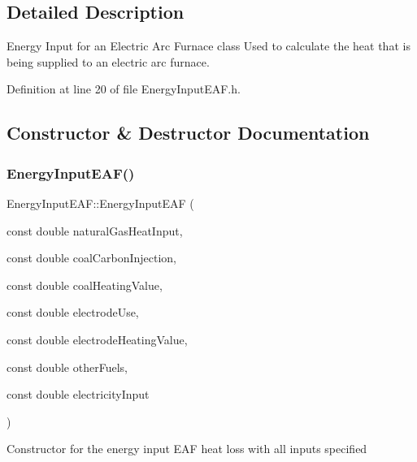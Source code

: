 \subsection{Detailed Description}
Energy Input for an Electric Arc Furnace class Used to calculate the heat that is being supplied to an electric arc furnace. 

Definition at line 20 of file Energy\+Input\+E\+A\+F.\+h.



\subsection{Constructor \& Destructor Documentation}
\mbox{\label{class_energy_input_e_a_f_a385f7047f5019124d7559cdbcb229a04}} 
\subsubsection{\texorpdfstring{Energy\+Input\+E\+A\+F()}{EnergyInputEAF()}\hspace{0.1cm}{\footnotesize\ttfamily [1/3]}}
{\footnotesize\ttfamily Energy\+Input\+E\+A\+F\+::\+Energy\+Input\+E\+AF (\begin{DoxyParamCaption}\item[{const double}]{natural\+Gas\+Heat\+Input,  }\item[{const double}]{coal\+Carbon\+Injection,  }\item[{const double}]{coal\+Heating\+Value,  }\item[{const double}]{electrode\+Use,  }\item[{const double}]{electrode\+Heating\+Value,  }\item[{const double}]{other\+Fuels,  }\item[{const double}]{electricity\+Input }\end{DoxyParamCaption})\hspace{0.3cm}{\ttfamily [inline]}}

Constructor for the energy input E\+AF heat loss with all inputs specified



